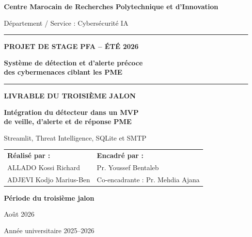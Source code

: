\documentclass[11pt,a4paper]{report}
\begin{document}
\begin{titlepage}
  \centering
  {\large\bfseries Centre Marocain de Recherches Polytechnique et d'Innovation\par}
  \vspace{0.25cm}
  {\large Département / Service : Cybersécurité IA\par}
  \vspace{1.3cm}
  \rule{\textwidth}{1.2pt}
  \vspace{0.5cm}

  {\Large\bfseries PROJET DE STAGE PFA -- ÉTÉ 2026\par}
  \vspace{0.5cm}
  {\LARGE\bfseries\color{cmrpiblue}
  Système de détection et d'alerte précoce\\
  des cybermenaces ciblant les PME\par}

  \vspace{0.5cm}
  \rule{\textwidth}{1.2pt}
  \vspace{1.3cm}

  {\Large\bfseries LIVRABLE DU TROISIÈME JALON\par}
  \vspace{0.7cm}
  {\LARGE\bfseries
  Intégration du détecteur dans un MVP\\
  de veille, d'alerte et de réponse PME\par}
  \vspace{0.4cm}
  {\large Streamlit, Threat Intelligence, SQLite et SMTP\par}

  \vfill

  \begin{tabularx}{\textwidth}{X X}
    \textbf{Réalisé par :} & \textbf{Encadré par :}\\[0.25cm]
    ALLADO Kossi Richard & Pr. Youssef Bentaleb\\
    ADJEVI Kodjo Marius-Ben & Co-encadrante : Pr. Mehdia Ajana
  \end{tabularx}

  \vfill
  {\large\bfseries Période du troisième jalon\par}
  {\large Août 2026\par}
  \vspace{0.7cm}
  {\large Année universitaire 2025--2026\par}
\end{titlepage}

\tableofcontents
\clearpage
{}
\end{document}
